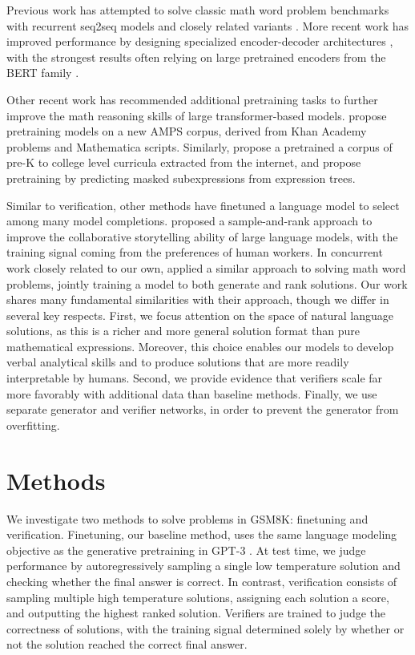 Previous work has attempted to solve classic math word problem benchmarks with recurrent seq2seq models \citep{sutskever2014sequence} and closely related variants \citep{wang-etal-2017-deep, huang2018neural}. More recent work has improved performance by designing specialized encoder-decoder architectures \citep{amini2019mathqa, chiang2018semantically, Xie2019AGT, Chen2020MappingNP, li2020graph}, with the strongest results often relying on large pretrained encoders from the BERT family \citep{chen2019neural, kim2020point, mwpbert}.

Other recent work has recommended additional pretraining tasks to further improve the math reasoning skills of large transformer-based models. \cite{hendrycks2021measuring} propose pretraining models on a new AMPS corpus, derived from Khan Academy problems and Mathematica scripts. Similarly, \cite{shen2021mathbert} propose a pretrained a corpus of pre-K to college level curricula extracted from the internet, and \cite{Peng2021MathBERTAP} propose pretraining by predicting masked subexpressions from expression trees.

Similar to verification, other methods have finetuned a language model to select among many model completions. \cite{nichols2020collaborative} proposed a sample-and-rank approach to improve the collaborative storytelling ability of large language models, with the training signal coming from the preferences of human workers. In concurrent work closely related to our own, \cite{shen2021generate} applied a similar approach to solving math word problems, jointly training a model to both generate and rank solutions. Our work shares many fundamental similarities with their approach, though we differ in several key respects. First, we focus attention on the space of natural language solutions, as this is a richer and more general solution format than pure mathematical expressions. Moreover, this choice enables our models to develop verbal analytical skills and to produce solutions that are more readily interpretable by humans. Second, we provide evidence that verifiers scale far more favorably with additional data than baseline methods. Finally, we use separate generator and verifier networks, in order to prevent the generator from overfitting.

\section{Methods}

We investigate two methods to solve problems in GSM8K: finetuning and verification. Finetuning, our baseline method, uses the same language modeling objective as the generative pretraining in GPT-3 \citep{brown2020language}. At test time, we judge performance by autoregressively sampling a single low temperature solution and checking whether the final answer is correct. In contrast, verification consists of sampling multiple high temperature solutions, assigning each solution a score, and outputting the highest ranked solution. Verifiers are trained to judge the correctness of solutions, with the training signal determined solely by whether or not the solution reached the correct final answer.

